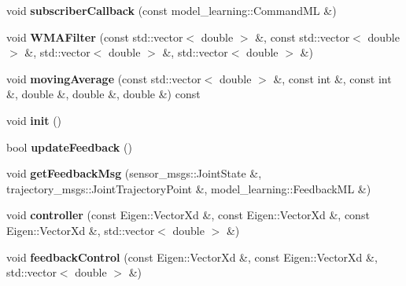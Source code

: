 \begin{DoxyCompactItemize}
\item 
void {\bfseries subscriber\+Callback} (const model\+\_\+learning\+::\+Command\+ML \&)\hypertarget{classarmcontroller_a9f48bad4ba4c88f294d1dd78df260fc7}{}\label{classarmcontroller_a9f48bad4ba4c88f294d1dd78df260fc7}

\item 
void {\bfseries W\+M\+A\+Filter} (const std\+::vector$<$ double $>$ \&, const std\+::vector$<$ double $>$ \&, std\+::vector$<$ double $>$ \&, std\+::vector$<$ double $>$ \&)\hypertarget{classarmcontroller_ac707c804ed04bcbf212c3c5456f4dffe}{}\label{classarmcontroller_ac707c804ed04bcbf212c3c5456f4dffe}

\item 
void {\bfseries moving\+Average} (const std\+::vector$<$ double $>$ \&, const int \&, const int \&, double \&, double \&, double \&) const \hypertarget{classarmcontroller_a0d755c82b60a3da6935dd9ce4968adcf}{}\label{classarmcontroller_a0d755c82b60a3da6935dd9ce4968adcf}

\item 
void {\bfseries init} ()\hypertarget{classarmcontroller_a45794311f7ab89c67fe7423e07ea19d7}{}\label{classarmcontroller_a45794311f7ab89c67fe7423e07ea19d7}

\item 
bool {\bfseries update\+Feedback} ()\hypertarget{classarmcontroller_a3cba85249ae1746aeac14d12b68becdc}{}\label{classarmcontroller_a3cba85249ae1746aeac14d12b68becdc}

\item 
void {\bfseries get\+Feedback\+Msg} (sensor\+\_\+msgs\+::\+Joint\+State \&, trajectory\+\_\+msgs\+::\+Joint\+Trajectory\+Point \&, model\+\_\+learning\+::\+Feedback\+ML \&)\hypertarget{classarmcontroller_af1970af350bf0902f57bdbf4089f3b13}{}\label{classarmcontroller_af1970af350bf0902f57bdbf4089f3b13}

\item 
void {\bfseries controller} (const Eigen\+::\+Vector\+Xd \&, const Eigen\+::\+Vector\+Xd \&, const Eigen\+::\+Vector\+Xd \&, std\+::vector$<$ double $>$ \&)\hypertarget{classarmcontroller_a5d9414eb9b6c92b3f19f177c44f9f6f1}{}\label{classarmcontroller_a5d9414eb9b6c92b3f19f177c44f9f6f1}

\item 
void {\bfseries feedback\+Control} (const Eigen\+::\+Vector\+Xd \&, const Eigen\+::\+Vector\+Xd \&, std\+::vector$<$ double $>$ \&)\hypertarget{classarmcontroller_a2385c8f95fd011e1206d2730615a4fad}{}\label{classarmcontroller_a2385c8f95fd011e1206d2730615a4fad}


\end{DoxyCompactItemize}
